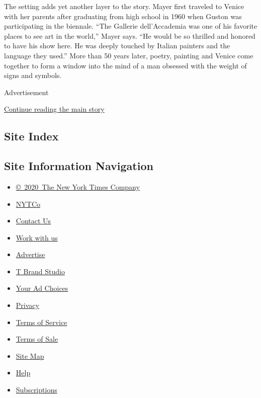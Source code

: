 The setting adds yet another layer to the story. Mayer first traveled to
Venice with her parents after graduating from high school in 1960 when
Guston was participating in the biennale. ``The Gallerie dell'Accademia
was one of his favorite places to see art in the world,'' Mayer says.
``He would be so thrilled and honored to have his show here. He was
deeply touched by Italian painters and the language they used.'' More
than 50 years later, poetry, painting and Venice come together to form a
window into the mind of a man obsessed with the weight of signs and
symbols.

Advertisement

\protect\hyperlink{after-bottom}{Continue reading the main story}

\hypertarget{site-index}{%
\subsection{Site Index}\label{site-index}}

\hypertarget{site-information-navigation}{%
\subsection{Site Information
Navigation}\label{site-information-navigation}}

\begin{itemize}
\tightlist
\item
  \href{https://help.nytimes3xbfgragh.onion/hc/en-us/articles/115014792127-Copyright-notice}{©~2020~The
  New York Times Company}
\end{itemize}

\begin{itemize}
\tightlist
\item
  \href{https://www.nytco.com/}{NYTCo}
\item
  \href{https://help.nytimes3xbfgragh.onion/hc/en-us/articles/115015385887-Contact-Us}{Contact
  Us}
\item
  \href{https://www.nytco.com/careers/}{Work with us}
\item
  \href{https://nytmediakit.com/}{Advertise}
\item
  \href{http://www.tbrandstudio.com/}{T Brand Studio}
\item
  \href{https://www.nytimes3xbfgragh.onion/privacy/cookie-policy\#how-do-i-manage-trackers}{Your
  Ad Choices}
\item
  \href{https://www.nytimes3xbfgragh.onion/privacy}{Privacy}
\item
  \href{https://help.nytimes3xbfgragh.onion/hc/en-us/articles/115014893428-Terms-of-service}{Terms
  of Service}
\item
  \href{https://help.nytimes3xbfgragh.onion/hc/en-us/articles/115014893968-Terms-of-sale}{Terms
  of Sale}
\item
  \href{https://spiderbites.nytimes3xbfgragh.onion}{Site Map}
\item
  \href{https://help.nytimes3xbfgragh.onion/hc/en-us}{Help}
\item
  \href{https://www.nytimes3xbfgragh.onion/subscription?campaignId=37WXW}{Subscriptions}
\end{itemize}
